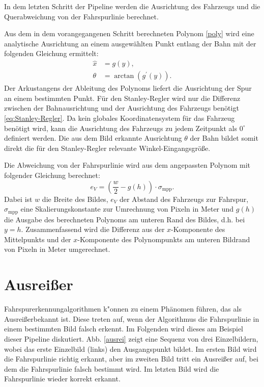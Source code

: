 \documentclass[arbeit=studie,oneside,BCOR=12mm]{ArbeitRST}
\begin{document}
In dem letzten Schritt der Pipeline werden die Ausrichtung des Fahrzeugs und die Querabweichung von
der Fahrspurlinie berechnet. 

Aus dem in dem vorangegangenen Schritt berechneten Polynom \eqref{poly} wird eine
analytische Ausrichtung an einem ausgewählten Punkt entlang der Bahn mit der
folgenden Gleichung \cite{tangentangle} ermittelt:
\begin{subequations} 
    \begin{align}
        \hat{x} &= g(y), \\
        \theta &= \arctan(g^\prime(y)).
    \end{align}
\end{subequations} 
Der Arkustangens der Ableitung des Polynoms liefert die Ausrichtung der Spur
an einem bestimmten Punkt. Für den Stanley-Regler wird nur die Differenz
zwischen der Bahnausrichtung und der Ausrichtung des Fahrzeugs benötigt \eqref{eq:Stanley-Regler}. Da
kein globales Koordinatensystem für das Fahrzeug benötigt wird, kann die
Ausrichtung des Fahrzeugs zu jedem Zeitpunkt als $0^{\circ}$ definiert
werden. Die aus dem Bild erkannte Ausrichtung $\theta$ der Bahn bildet somit
direkt die für den Stanley-Regler relevante Winkel-Eingangsgröße.

Die Abweichung von der Fahrspurlinie wird aus dem angepassten Polynom mit
folgender Gleichung \cite{addison-pipeline} berechnet: 
\begin{equation}
    e_{V} = \left(\frac{w}{2} - g(h)\right)\cdot \sigma_\mathrm{mpp}.
\end{equation}
Dabei ist $w$ die Breite des Bildes, $e_{V}$ der Abstand des Fahrzeugs zur
Fahrspur, $\sigma_\mathrm{mpp}$ eine Skalierungskonstante zur Umrechnung von
Pixeln in Meter und $g(h)$ die Ausgabe des berechneten Polynoms am unteren Rand
des Bildes, d.h. bei $y=h$. Zusammenfassend wird die Differenz aus der
$x$-Komponente des Mittelpunkts und der $x$-Komponente des Polynompunkts am
unteren Bildrand von Pixeln in Meter umgerechnet.

\section{Ausrei{\ss}er}

Fahrspurerkennungalgorithmen k"onnen zu einem Phänomen führen, das als \glqq
Ausreißer\grqq bekannt ist. Diese treten auf, wenn der Algorithmus die
Fahrspurlinie in einem bestimmten Bild falsch erkennt. Im Folgenden wird dieses 
am Beispiel dieser Pipeline diskutiert. Abb. \ref{ausrei} zeigt
eine Sequenz von drei Einzelbildern, wobei das erste Einzelbild (links) den
Ausgangspunkt bildet. Im ersten Bild wird die Fahrspurlinie richtig erkannt,
aber im zweiten Bild tritt ein Ausreißer auf, bei dem die Fahrspurlinie falsch
bestimmt wird. Im letzten Bild wird die Fahrspurlinie wieder korrekt erkannt.
\end{document}
